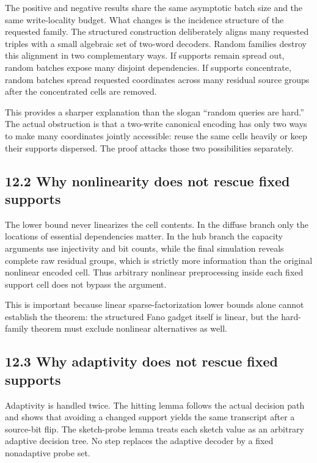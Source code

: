 \documentclass[
]{article}
\begin{document}
The positive and negative results share the same asymptotic batch size
and the same write-locality budget. What changes is the incidence
structure of the requested family. The structured construction
deliberately aligns many requested triples with a small algebraic set of
two-word decoders. Random families destroy this alignment in two
complementary ways. If supports remain spread out, random batches expose
many disjoint dependencies. If supports concentrate, random batches
spread requested coordinates across many residual source groups after
the concentrated cells are removed.

This provides a sharper explanation than the slogan ``random queries are
hard.'' The actual obstruction is that a two-write canonical encoding
has only two ways to make many coordinates jointly accessible: reuse the
same cells heavily or keep their supports dispersed. The proof attacks
those two possibilities separately.

\hypertarget{why-nonlinearity-does-not-rescue-fixed-supports}{%
\subsection{12.2 Why nonlinearity does not rescue fixed
supports}\label{why-nonlinearity-does-not-rescue-fixed-supports}}

The lower bound never linearizes the cell contents. In the diffuse
branch only the locations of essential dependencies matter. In the hub
branch the capacity arguments use injectivity and bit counts, while the
final simulation reveals complete raw residual groups, which is strictly
more information than the original nonlinear encoded cell. Thus
arbitrary nonlinear preprocessing inside each fixed support cell does
not bypass the argument.

This is important because linear sparse-factorization lower bounds alone
cannot establish the theorem: the structured Fano gadget itself is
linear, but the hard-family theorem must exclude nonlinear alternatives
as well.

\hypertarget{why-adaptivity-does-not-rescue-fixed-supports}{%
\subsection{12.3 Why adaptivity does not rescue fixed
supports}\label{why-adaptivity-does-not-rescue-fixed-supports}}

Adaptivity is handled twice. The hitting lemma follows the actual
decision path and shows that avoiding a changed support yields the same
transcript after a source-bit flip. The sketch-probe lemma treats each
sketch value as an arbitrary adaptive decision tree. No step replaces
the adaptive decoder by a fixed nonadaptive probe set.
\end{document}
